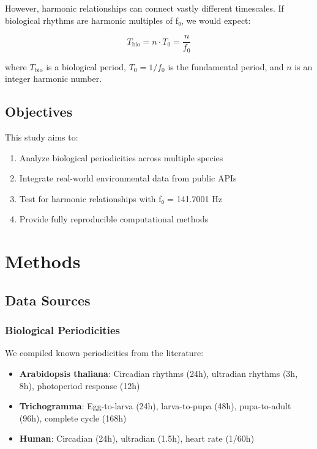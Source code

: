 \documentclass[11pt,a4paper]{article}
\begin{document}
However, harmonic relationships can connect vastly different timescales. If biological rhythms are harmonic multiples of f₀, we would expect:

\begin{equation}
T_{\text{bio}} = n \cdot T_0 = \frac{n}{f_0}
\end{equation}

where $T_{\text{bio}}$ is a biological period, $T_0 = 1/f_0$ is the fundamental period, and $n$ is an integer harmonic number.

\subsection{Objectives}

This study aims to:
\begin{enumerate}
    \item Analyze biological periodicities across multiple species
    \item Integrate real-world environmental data from public APIs
    \item Test for harmonic relationships with f₀ = 141.7001 Hz
    \item Provide fully reproducible computational methods
\end{enumerate}

\section{Methods}

\subsection{Data Sources}

\subsubsection{Biological Periodicities}

We compiled known periodicities from the literature:

\begin{itemize}
    \item \textbf{Arabidopsis thaliana}: Circadian rhythms (24h), ultradian rhythms (3h, 8h), photoperiod response (12h) \citep{mcclung2006}
    \item \textbf{Trichogramma}: Egg-to-larva (24h), larva-to-pupa (48h), pupa-to-adult (96h), complete cycle (168h) \citep{consoli1999}
    \item \textbf{Human}: Circadian (24h), ultradian (1.5h), heart rate (1/60h)
\end{itemize}
\end{document}
